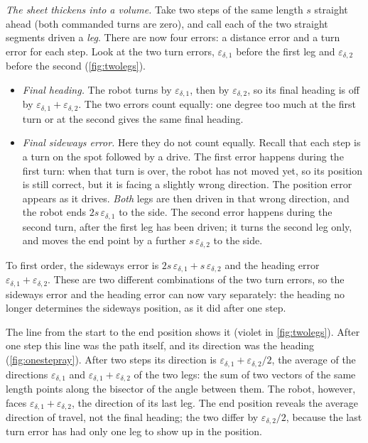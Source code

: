 \emph{The sheet thickens into a volume.} Take two steps of the same length
$s$ straight ahead (both commanded turns are zero), and call each of the
two straight segments driven a \emph{leg}. There are now four errors: a
distance error and a turn error for each step. Look at the two turn
errors, $\varepsilon_{\delta,1}$ before the first leg and
$\varepsilon_{\delta,2}$ before the second (\cref{fig:twolegs}).
\begin{itemize}[nosep]
  \item \emph{Final heading.} The robot turns by $\varepsilon_{\delta,1}$,
    then by $\varepsilon_{\delta,2}$, so its final heading is off by
    $\varepsilon_{\delta,1}+\varepsilon_{\delta,2}$. The two errors count
    equally: one degree too much at the first turn or at the second gives
    the same final heading.
  \item \emph{Final sideways error.} Here they do not count equally.
    Recall that each step is a turn on the spot followed by a drive. The
    first error happens during the first turn: when that turn is over, the
    robot has not moved yet, so its position is still correct, but it is
    facing a slightly wrong direction. The position error appears as it
    drives. \emph{Both} legs are then driven in that wrong direction, and
    the robot ends $2s\,\varepsilon_{\delta,1}$ to the side. The second
    error happens during the second turn, after the first leg has been
    driven; it turns the second leg only, and moves the end point by a
    further $s\,\varepsilon_{\delta,2}$ to the side.
\end{itemize}
To first order, the sideways error is
$2s\,\varepsilon_{\delta,1}+s\,\varepsilon_{\delta,2}$ and the heading error
$\varepsilon_{\delta,1}+\varepsilon_{\delta,2}$. These are two different
combinations of the two turn errors, so the sideways error and the heading
error can now vary separately: the heading no longer determines the
sideways position, as it did after one step.

The line from the start to the end position shows it (violet in
\cref{fig:twolegs}). After one step this line was the path itself, and its
direction was the heading (\cref{fig:onestepray}). After two steps its
direction is $\varepsilon_{\delta,1}+\varepsilon_{\delta,2}/2$, the average
of the directions $\varepsilon_{\delta,1}$ and
$\varepsilon_{\delta,1}+\varepsilon_{\delta,2}$ of the two legs: the sum of
two vectors of the same length points along the bisector of the angle
between them. The robot, however, faces
$\varepsilon_{\delta,1}+\varepsilon_{\delta,2}$, the direction of its last
leg. The end position reveals the average direction of travel, not the
final heading; the two differ by $\varepsilon_{\delta,2}/2$, because the
last turn error has had only one leg to show up in the position.


